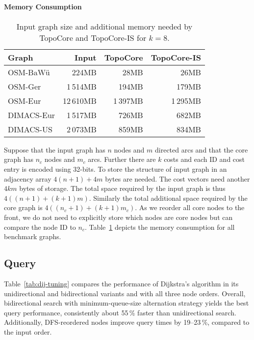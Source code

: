 \documentclass{sig-alternate}
\begin{document}
\paragraph{Memory Consumption}

\begin{table}
\caption{\label{tab:memory}Input graph size and additional memory needed by TopoCore and TopoCore-IS for $k=8$.}
\begin{centering}
\begin{tabular}{lrrr}
\toprule
Graph & Input & TopoCore & TopoCore-IS \\
\midrule
OSM-BaWü & 224MB & 28MB & 26MB \\
OSM-Ger & 1\,514MB & 194MB & 179MB \\
OSM-Eur & 12\,610MB & 1\,397MB & 1\,295MB \\
 \addlinespace
DIMACS-Eur & 1\,517MB & 726MB & 682MB \\
DIMACS-US & 2\,073MB & 859MB & 834MB \\
\bottomrule
\end{tabular}
\par\end{centering}
\end{table}

Suppose that the input graph has $n$ nodes and $m$ directed arcs and that the core graph has $n_c$ nodes and $m_c$ arcs. 
Further there are $k$ costs and each ID and cost entry is encoded using 32-bits. 
To store the structure of input graph in an adjacency array $4(n+1)+4m$ bytes are needed.
The cost vectors need another $4km$ bytes of storage.
The total space required by the input graph is thus $4((n+1)+(k+1)m)$.
Similarly the total additional space required by the core graph is $4((n_c+1)+(k+1)m_c)$. 
As we reorder all core nodes to the front, we do not need to explicitly store which nodes are core nodes but can compare the node ID to $n_c$.
Table~\ref{tab:memory} depicts the memory consumption for all benchmark graphs.

\subsection{Query}




Table~\ref{tab:dij-tuning} compares the performance
of Dijkstra's algorithm in its unidirectional
and bidirectional variants and with all three node orders.
Overall, bidirectional search with minimum-queue-size alternation
strategy yields the best query performance, consistently about 55\,\% faster than unidirectional search.
Additionally, DFS-reordered nodes improve query times by 19--23\,\%, compared to the input order.
\end{document}
